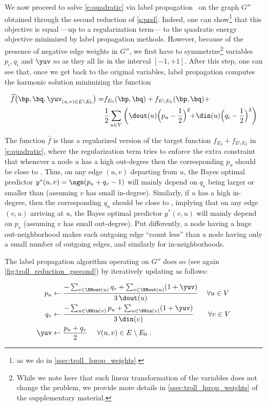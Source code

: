 We now proceed to solve \eqref{e:quadratic} via label propagation~\autocite{LabelPropa03} on the
graph $G''$ obtained through the second reduction of \autoref{s:prel}.
Indeed, one can show\footnote{as we do in \autoref{ssec:troll_lprop_weights}.} that this objective is
equal ---up to a regularization term--- to the quadratic energy objective minimized by label
propagation methods.
However, because of the presence of negative edge weights in $G''$, we first have to symmetrize\footnote{%
While we note here that such linear transformation of the variables does not change the problem, we
provide more details in \autoref{ssec:troll_lprop_weights} of the supplementary material.} variables
$p_i, q_i$ and $\yuv$ so as they all lie in the interval $[-1,+1]$.
After this step, one can see that, once we get back to the original variables, label propagation
computes the harmonic solution minimizing the function

\begin{align*}
{\widehat f}\big(\bp,\bq,{\yuv}_{(u,v) \in E\setminus E_0}\big)
= &f_{E_0}(\bp,\bq) + f_{E\setminus E_0}(\bp,\bq) +\\
  &\frac{1}{2}\sum_{u\in V}
\left(\dout(u)\Bigl(p_u-\frac{1}{2}\Bigl)^2+\din(u)\Bigl(q_i-\frac{1}{2}\Bigl)^2\right)
\end{align*}

The function ${\widehat f}$ is thus a regularized version of the target function $f_{E_0} +
f_{E\setminus E_0}$ in \eqref{e:quadratic}, where the regularization term tries to enforce the extra
constraint that whenever a node $u$ has a high out-degree then the corresponding $p_u$ should be
close to \shalf. Thus, on any edge $(u,v)$ departing from $u$, the Bayes optimal predictor $y^*(u,v)
= \sgn(p_u+q_v-1)$ will mainly depend on $q_v$ being larger or smaller than \shalf{} (assuming $v$
has small in-degree). Similarly, if $u$ has a high in-degree, then the corresponding $q_u$ should be
close to \shalf{}, implying that on any edge $(v,u)$ arriving at $u$, the Bayes optimal predictor
$y^*(v,u)$ will mainly depend on $p_v$ (assuming $v$ has small out-degree). Put differently, a node
having a huge out-neighborhood makes each outgoing edge \enquote{count less} than a node having only
a small number of outgoing edges, and similarly for in-neighborhoods.

The label propagation algorithm operating on $G''$ does so (see again
\autoref{fig:troll_reduction_gsecond}) by iteratively updating as follows:

\begin{align*}
  p_{u}  & \leftarrow \frac{-\sum_{v \in \NNout(u)} q_{v} + \sum_{v \in \NNout(u)} (1+\yuv)}{3\,\dout(u)}\,\quad\forall u\in V\\
  q_{v}  & \leftarrow \frac{-\sum_{u \in  \NNin(v)} p_{u} + \sum_{u \in \NNin(v) } (1+\yuv)}{3\,\din(v)}\qquad\forall v \in V\\
  \yuv & \leftarrow \frac{p_u + q_v}{2}~ \quad \forall (u,v) \in E\setminus E_0~.
\end{align*}

